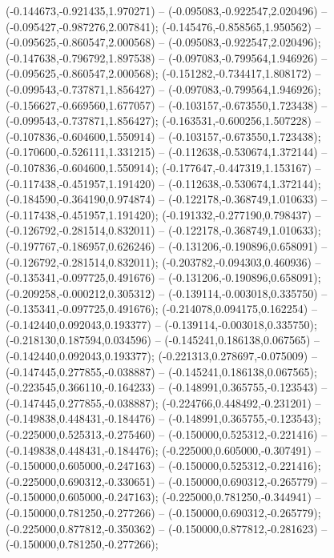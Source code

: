  (-0.144673,-0.921435,1.970271) -- (-0.095083,-0.922547,2.020496) -- (-0.095427,-0.987276,2.007841);
 (-0.145476,-0.858565,1.950562) -- (-0.095625,-0.860547,2.000568) -- (-0.095083,-0.922547,2.020496);
 (-0.147638,-0.796792,1.897538) -- (-0.097083,-0.799564,1.946926) -- (-0.095625,-0.860547,2.000568);
 (-0.151282,-0.734417,1.808172) -- (-0.099543,-0.737871,1.856427) -- (-0.097083,-0.799564,1.946926);
 (-0.156627,-0.669560,1.677057) -- (-0.103157,-0.673550,1.723438) -- (-0.099543,-0.737871,1.856427);
 (-0.163531,-0.600256,1.507228) -- (-0.107836,-0.604600,1.550914) -- (-0.103157,-0.673550,1.723438);
 (-0.170600,-0.526111,1.331215) -- (-0.112638,-0.530674,1.372144) -- (-0.107836,-0.604600,1.550914);
 (-0.177647,-0.447319,1.153167) -- (-0.117438,-0.451957,1.191420) -- (-0.112638,-0.530674,1.372144);
 (-0.184590,-0.364190,0.974874) -- (-0.122178,-0.368749,1.010633) -- (-0.117438,-0.451957,1.191420);
 (-0.191332,-0.277190,0.798437) -- (-0.126792,-0.281514,0.832011) -- (-0.122178,-0.368749,1.010633);
 (-0.197767,-0.186957,0.626246) -- (-0.131206,-0.190896,0.658091) -- (-0.126792,-0.281514,0.832011);
 (-0.203782,-0.094303,0.460936) -- (-0.135341,-0.097725,0.491676) -- (-0.131206,-0.190896,0.658091);
 (-0.209258,-0.000212,0.305312) -- (-0.139114,-0.003018,0.335750) -- (-0.135341,-0.097725,0.491676);
 (-0.214078,0.094175,0.162254) -- (-0.142440,0.092043,0.193377) -- (-0.139114,-0.003018,0.335750);
 (-0.218130,0.187594,0.034596) -- (-0.145241,0.186138,0.067565) -- (-0.142440,0.092043,0.193377);
 (-0.221313,0.278697,-0.075009) -- (-0.147445,0.277855,-0.038887) -- (-0.145241,0.186138,0.067565);
 (-0.223545,0.366110,-0.164233) -- (-0.148991,0.365755,-0.123543) -- (-0.147445,0.277855,-0.038887);
 (-0.224766,0.448492,-0.231201) -- (-0.149838,0.448431,-0.184476) -- (-0.148991,0.365755,-0.123543);
 (-0.225000,0.525313,-0.275460) -- (-0.150000,0.525312,-0.221416) -- (-0.149838,0.448431,-0.184476);
 (-0.225000,0.605000,-0.307491) -- (-0.150000,0.605000,-0.247163) -- (-0.150000,0.525312,-0.221416);
 (-0.225000,0.690312,-0.330651) -- (-0.150000,0.690312,-0.265779) -- (-0.150000,0.605000,-0.247163);
 (-0.225000,0.781250,-0.344941) -- (-0.150000,0.781250,-0.277266) -- (-0.150000,0.690312,-0.265779);
 (-0.225000,0.877812,-0.350362) -- (-0.150000,0.877812,-0.281623) -- (-0.150000,0.781250,-0.277266);
